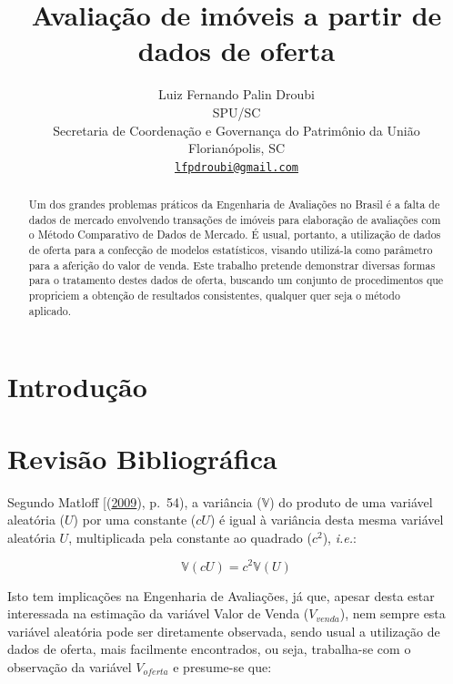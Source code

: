\documentclass{article}
\title{Avaliação de imóveis a partir de dados de oferta}
\author{
    Luiz Fernando Palin Droubi
   \\
    SPU/SC \\
    Secretaria de Coordenação e Governança do Patrimônio da União \\
  Florianópolis, SC \\
  \texttt{\href{mailto:lfpdroubi@gmail.com}{\nolinkurl{lfpdroubi@gmail.com}}} \\
  }
\begin{document}
\maketitle

\def\tightlist{}


\begin{abstract}
Um dos grandes problemas práticos da Engenharia de Avaliações no Brasil
é a falta de dados de mercado envolvendo transações de imóveis para
elaboração de avaliações com o Método Comparativo de Dados de Mercado. É
usual, portanto, a utilização de dados de oferta para a confecção de
modelos estatísticos, visando utilizá-la como parâmetro para a aferição
do valor de venda. Este trabalho pretende demonstrar diversas formas
para o tratamento destes dados de oferta, buscando um conjunto de
procedimentos que propriciem a obtenção de resultados consistentes,
qualquer quer seja o método aplicado.
\end{abstract}


\hypertarget{introduuxe7uxe3o}{%
\section{Introdução}\label{introduuxe7uxe3o}}

\hypertarget{revisuxe3o-bibliogruxe1fica}{%
\section{Revisão Bibliográfica}\label{revisuxe3o-bibliogruxe1fica}}

Segundo Matloff {[}(\protect\hyperlink{ref-matloff2009}{2009}), p.~54),
a variância (\(\mathbb V\)) do produto de uma variável aleatória (\(U\))
por uma constante (\(cU\)) é igual à variância desta mesma variável
aleatória \(U\), multiplicada pela constante ao quadrado (\(c^2\)),
\emph{i.e.}:

\begin{equation}
\label{eq:varprop}
\mathbb{V}(cU) = c^2\mathbb{V}(U)
\end{equation}

Isto tem implicações na Engenharia de Avaliações, já que, apesar desta
estar interessada na estimação da variável Valor de Venda
(\(V_{venda}\)), nem sempre esta variável aleatória pode ser diretamente
observada, sendo usual a utilização de dados de oferta, mais facilmente
encontrados, ou seja, trabalha-se com o observação da variável
\(V_{oferta}\) e presume-se que:
\end{document}
